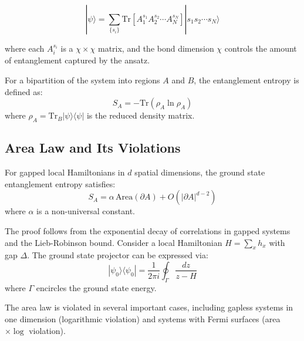 \documentclass[papermode]{academic-report}
\begin{document}
\begin{equation}
  |\psi\rangle = \sum_{\{s_i\}} \mathrm{Tr}\left[A_1^{s_1} A_2^{s_2} \cdots A_N^{s_N}\right] |s_1 s_2 \cdots s_N\rangle
  \label{eq:mps}
\end{equation}

where each $A_i^{s_i}$ is a $\chi \times \chi$ matrix, and the bond dimension
$\chi$ controls the amount of entanglement captured by the ansatz.

\begin{definitionblock}
For a bipartition of the system into regions $A$ and $B$, the entanglement
entropy is defined as:
\begin{equation}
  S_A = -\mathrm{Tr}(\rho_A \ln \rho_A)
  \label{eq:entanglement}
\end{equation}
where $\rho_A = \mathrm{Tr}_B|\psi\rangle\langle\psi|$ is the reduced density
matrix.
\end{definitionblock}

\subsection{Area Law and Its Violations}

\begin{theoremblock}
For gapped local Hamiltonians in $d$ spatial dimensions, the ground state
entanglement entropy satisfies:
\begin{equation}
  S_A = \alpha\, \mathrm{Area}(\partial A) + O(|\partial A|^{d-2})
  \label{eq:arealaw}
\end{equation}
where $\alpha$ is a non-universal constant.
\end{theoremblock}

\begin{proofblock}
The proof follows from the exponential decay of correlations in gapped systems
and the Lieb-Robinson bound. Consider a local Hamiltonian $H = \sum_x h_x$ with
gap $\Delta$. The ground state projector can be expressed via:
\begin{equation}
  |\psi_0\rangle\langle\psi_0| = \frac{1}{2\pi i} \oint_\Gamma \frac{dz}{z - H}
\end{equation}
where $\Gamma$ encircles the ground state energy.
\end{proofblock}

\begin{remarkblock}
The area law is violated in several important cases, including gapless systems
in one dimension (logarithmic violation) and systems with Fermi surfaces
(area $\times \log$ violation).
\end{remarkblock}
\end{document}
